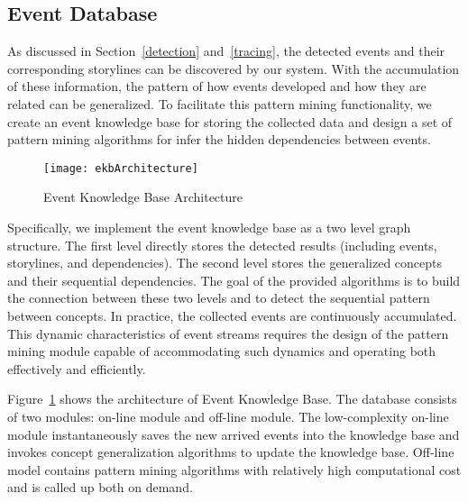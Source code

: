 \subsection{Event Database}
As discussed in Section~\ref{detection} and~\ref{tracing}, the detected events and their corresponding storylines can be discovered by our system. With the accumulation of these information, the pattern of how events developed and how they are related can be generalized. To facilitate this pattern mining functionality, we create an event knowledge base for storing the collected data and design a set of pattern mining algorithms for infer the hidden dependencies between events.
\begin{figure}[h!]
\centering
\texttt{[image: ekbArchitecture]}
\caption{Event Knowledge Base Architecture}
\label{fig:architecture}
\end{figure}

Specifically, we implement the event knowledge base as a two level graph structure. The first level directly stores the detected results (including events, storylines, and dependencies). The second level stores the generalized concepts and their sequential dependencies. The goal of the provided algorithms is to build the connection between these two levels and to detect the sequential pattern between concepts. In practice, the collected events are continuously accumulated. This dynamic characteristics of event streams requires the design of the pattern mining module capable of accommodating such dynamics and operating both effectively and efficiently.

Figure~\ref{fig:architecture} shows the architecture of Event Knowledge Base. The database consists of two modules: on-line module and off-line module. The low-complexity on-line module instantaneously saves the new arrived events into the knowledge base and invokes concept generalization algorithms to update the knowledge base. Off-line model contains pattern mining algorithms with relatively high computational cost and is called up both on demand.

